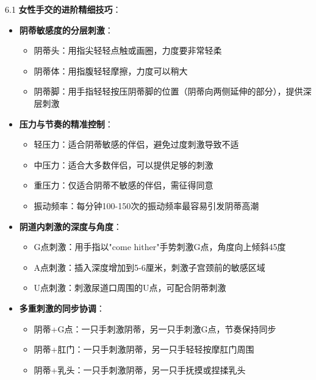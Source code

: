 \documentclass[12pt,UTF8]{ctexbook}
\begin{document}
6.1 \textbf{女性手交的进阶精细技巧}：
\begin{itemize}
	\item \textbf{阴蒂敏感度的分层刺激}：
	\begin{itemize}
		\item 阴蒂头：用指尖轻轻点触或画圈，力度要非常轻柔
		\item 阴蒂体：用指腹轻轻摩擦，力度可以稍大
		\item 阴蒂脚：用手指轻轻按压阴蒂脚的位置（阴蒂向两侧延伸的部分），提供深层刺激
	\end{itemize}
	\item \textbf{压力与节奏的精准控制}：
	\begin{itemize}
		\item 轻压力：适合阴蒂敏感的伴侣，避免过度刺激导致不适
		\item 中压力：适合大多数伴侣，可以提供足够的刺激
		\item 重压力：仅适合阴蒂不敏感的伴侣，需征得同意
		\item 振动频率：每分钟100-150次的振动频率最容易引发阴蒂高潮
	\end{itemize}
	\item \textbf{阴道内刺激的深度与角度}：
	\begin{itemize}
		\item G点刺激：用手指以"come hither"手势刺激G点，角度向上倾斜45度
		\item A点刺激：插入深度增加到5-6厘米，刺激子宫颈前的敏感区域
		\item U点刺激：刺激尿道口周围的U点，可配合阴蒂刺激
	\end{itemize}
	\item \textbf{多重刺激的同步协调}：
	\begin{itemize}
		\item 阴蒂+G点：一只手刺激阴蒂，另一只手刺激G点，节奏保持同步
		\item 阴蒂+肛门：一只手刺激阴蒂，另一只手轻轻按摩肛门周围
		\item 阴蒂+乳头：一只手刺激阴蒂，另一只手抚摸或捏揉乳头
	\end{itemize}
\end{itemize}
\end{document}
